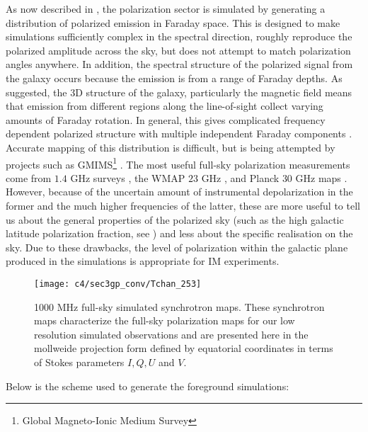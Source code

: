 As now described in \citep{ansah2018simulations}, the polarization sector is simulated by generating a distribution of polarized emission in Faraday space. 
This is designed to make simulations sufficiently complex in the spectral direction, roughly reproduce the polarized 
amplitude across the sky, but does not attempt to match polarization angles anywhere. In addition, the spectral structure of the polarized signal 
from the galaxy occurs because the emission is from a range of Faraday depths. 
As suggested, the 3D structure of the galaxy, particularly the magnetic field means that emission from different regions along the 
line-of-sight collect varying amounts of Faraday rotation. In general, this gives complicated frequency dependent polarized structure 
with multiple independent Faraday components \citep[see Figure 9]{wolleben2010rotation}. Accurate mapping of this distribution is difficult, 
but is being attempted by projects such as GMIMS\footnote{{Global Magneto-Ionic Medium Survey}} \citep{GMIMS}. The most useful full-sky 
polarization measurements come from $1.4$ GHz surveys \citep{Wolleben2006,Testori2008}, the WMAP $23$ GHz \citep{WMAP_9yr_maps},
and Planck $30$ GHz maps \citep{Planck_2015_maps}. However, because of the uncertain amount of instrumental depolarization in the former and the much 
higher frequencies of the latter, these are more useful to tell us about the general properties of the polarized sky (such as the high galactic latitude
polarization fraction, see \cite{Kogut2007}) and less about the specific realisation on the sky.
Due to these drawbacks, the level of polarization within the galactic plane produced in the simulations is appropriate for IM experiments.  %
\begin{figure}[ht]
	    \centering
	    \texttt{[image: c4/sec3gp\_conv/Tchan\_253]}
	    \caption{1000 MHz full-sky simulated synchrotron maps. These synchrotron maps characterize the 
     full-sky polarization maps for our low resolution simulated observations and are presented here in the mollweide projection form defined by equatorial coordinates in terms of Stokes parameters $I, Q, U$ and $V$.}
	    \label{fig:f1000}
       \end{figure}
\FloatBarrier

Below is the scheme used to generate the foreground simulations:

